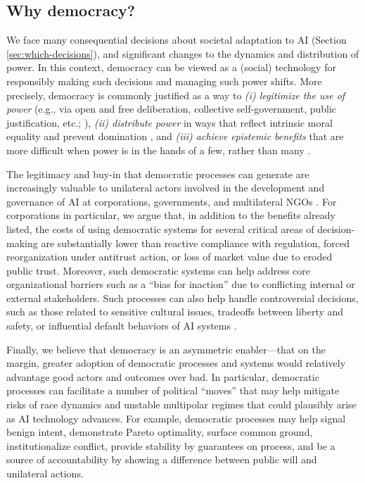 \documentclass{article}
\begin{document}
\subsection{Why democracy?}

    We face many consequential decisions about societal adaptation to AI (Section \ref{sec:which-decisions}), and significant changes to the dynamics and distribution of power. In this context, democracy can be viewed as a (social) technology for responsibly making such decisions and managing such power shifts. More precisely, democracy is commonly justified as a way to \textit{(i) legitimize the use of power} (e.g., via open and free deliberation, collective self-government, public justification, etc.; \citep[e.g.,][]{Habermas1962,Habermas1989,Habermas1992,cohen2002,cohen2003,rousseau1762,cordelli2020,lafont2019,young2002}), \textit{(ii) distribute power} in ways that reflect intrinsic moral equality \citep[e.g.,][]{Dahl1956,dahl1989democracy,BuchananTullock1962} and prevent domination \citep[e.g.,][]{Pettit1997,Pettit2012}, and \textit{(iii) achieve epistemic benefits} that are more difficult when power is in the hands of a few, rather than many \citep[e.g.,][]{estlund2005authority,estlund2009democratic,landemore2013democratic,Landemore2020}.

    The legitimacy and buy-in that democratic processes can generate are increasingly valuable to unilateral actors involved in the development and governance of AI at corporations, governments, and multilateral NGOs \cite{stilgoe2024}. For corporations in particular, we argue that, in addition to the benefits already listed, the costs of using democratic systems for several critical areas of decision-making are substantially lower than reactive compliance with regulation, forced reorganization under antitrust action, or loss of market value due to eroded public trust. Moreover, such democratic systems can help address core organizational barriers such as a ``bias for inaction'' due to conflicting internal or external stakeholders. Such processes can also help handle controversial decisions, such as those related to sensitive cultural issues, tradeoffs between liberty and safety, or influential default behaviors of AI systems \citep[e.g.,][]{raghavan2024,openai2025}. 

    Finally, we believe that democracy is an asymmetric enabler---that on the margin, greater adoption of democratic processes and systems would relatively advantage good actors and outcomes over bad. In particular, democratic processes can facilitate a number of political ``moves'' that may help mitigate risks of race dynamics and unstable multipolar regimes that could plausibly arise as AI technology advances. For example, democratic processes may help signal benign intent, demonstrate Pareto optimality, surface common ground, institutionalize conflict, provide stability by guarantees on process, and be a source of accountability by showing a difference between public will and unilateral actions. 
\end{document}
